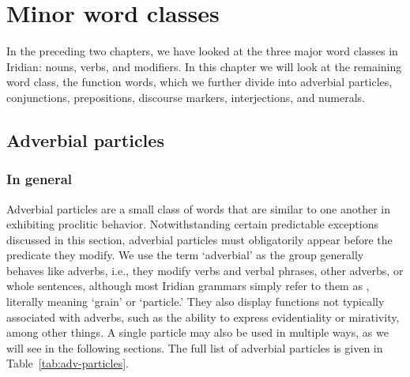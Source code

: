 \chapter{Minor word classes}\label{chap:minor}

In the preceding two chapters, we have looked at the three major word classes in Iridian: nouns, verbs, and modifiers. In this chapter we will look at the remaining word class, the function words, which we further divide into adverbial particles, conjunctions, prepositions, discourse markers, interjections, and numerals.

\section{Adverbial particles}\label{sec:adv-particles}

\subsection{In general}\label{sec:adv-particles-general}

Adverbial particles are a small class of words that are similar to one another
in exhibiting proclitic behavior. Notwithstanding certain predictable exceptions
discussed in this section, adverbial particles must obligatorily appear before
the predicate they modify. We use the term `adverbial' as the group generally
behaves like adverbs, i.e., they modify verbs and verbal phrases, other adverbs,
or whole sentences, although most Iridian grammars simply refer to them as
, literally meaning `grain' or `particle.' They also display functions
not typically associated with adverbs, such as the ability to express
evidentiality or mirativity, among other things. A single particle may also be
used in multiple ways, as we will see in the following sections. The full list
of adverbial particles is given in Table~\ref{tab:adv-particles}.

